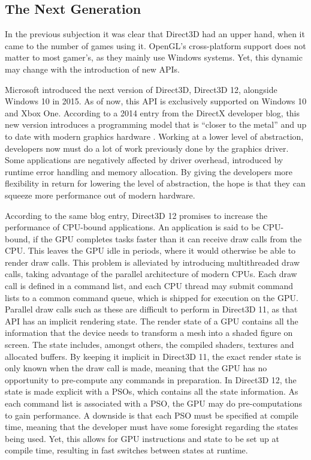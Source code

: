 \subsection{The Next Generation}
In the previous subjection it was clear that Direct3D had an upper hand, when it came to the number of games using it.
OpenGL’s cross-platform support does not matter to most gamer’s, as they mainly use Windows systems.
Yet, this dynamic may change with the introduction of new \glspl{API}.


Microsoft introduced the next version of Direct3D, Direct3D 12, alongside Windows 10 in 2015.
As of now, this \gls{API} is exclusively supported on Windows 10 and Xbox One.
According to a 2014 entry from the DirectX developer blog, this new version introduces a programming model that is “closer to the metal” and up to date with modern graphics hardware \cite{directXBlog}.
Working at a lower level of abstraction, developers now must do a lot of work previously done by the graphics driver.
Some applications are negatively affected by driver overhead, introduced by runtime error handling and memory allocation.
By giving the developers more flexibility in return for lowering the level of abstraction, the hope is that they can squeeze more performance out of modern hardware.
  
  
According to the same blog entry, Direct3D 12 promises to increase the performance of CPU-bound applications.
An application is said to be \gls{CPU}-bound, if the \gls{GPU} completes tasks faster than it can receive draw calls from the \gls{CPU}.
This leaves the \gls{GPU} idle in periods, where it would otherwise be able to render draw calls.
This problem is alleviated by introducing multithreaded draw calls, taking advantage of the parallel architecture of modern \glspl{CPU}.
Each draw call is defined in a command list, and each \gls{CPU} thread may submit command lists to a common command queue, which is shipped for execution on the \gls{GPU}.
Parallel draw calls such as these are difficult to perform in Direct3D 11, as that \gls{API} has an implicit rendering state.
The render state of a \gls{GPU} contains all the information that the device needs to transform a mesh into a shaded figure on screen.
The state includes, amongst others, the compiled shaders, textures and allocated buffers.
By keeping it implicit in Direct3D 11, the exact render state is only known when the draw call is made, meaning that the \gls{GPU} has no opportunity to pre-compute any commands in preparation.
In Direct3D 12, the state is made explicit with a \glspl{PSO}, which contains all the state information.
As each command list is associated with a \gls{PSO}, the \gls{GPU} may do pre-computations to gain performance.
A downside is that each \gls{PSO} must be specified at compile time, meaning that the developer must have some foresight regarding the states being used.
Yet, this allows for \gls{GPU} instructions and state to be set up at compile time, resulting in fast switches between states at runtime.  


